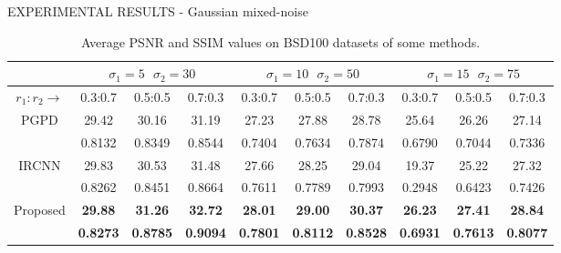 \begin{frame}{EXPERIMENTAL RESULTS - Gaussian mixed-noise}
    \begin{table}[htbp]
        \centering
        \begin{adjustbox}{width=0.8\textwidth}
        \begin{tabular}{|c||ccc|ccc|ccc|}
            \hline
                & \multicolumn{3}{c||}{$\sigma_1=5 ~~~\sigma_2=30 $} & \multicolumn{3}{c||}{$\sigma_1=10 ~~~\sigma_2=50 $} & \multicolumn{3}{c||}{$\sigma_1=15 ~~~\sigma_2=75 $}\\
            \hline        
            $r_1:r_2\rightarrow$ & 0.3:0.7 & 0.5:0.5 & 0.7:0.3 & 0.3:0.7 & 0.5:0.5 & 0.7:0.3 & 0.3:0.7 & 0.5:0.5 & 0.7:0.3\\
            \hline 
            \hline
            \multirow{2}{*}{PGPD\cite{0884882815}} & 29.42 & 30.16 & 31.19 & 27.23 & 27.88 & 28.78 &25.64 & 26.26 & 27.14\\
            & 0.8132 & 0.8349 & 0.8544 & 0.7404 & 0.7634 & 0.7874 & 0.6790 & 0.7044 & 0.7336\\
            \hline
            \multirow{2}{*}{IRCNN\cite{0884882819}} & 29.83 & 30.53 & 31.48 & 27.66 & 28.25 & 29.04 & 19.37 & 25.22 & 27.32\\
            & 0.8262 & 0.8451 & 0.8664 & 0.7611 & 0.7789 & 0.7993 & 0.2948 & 0.6423 & 0.7426\\
            \hline
            \multirow{2}{*}{Proposed} & \bfseries{29.88} & \bfseries{31.26} & \bfseries{32.72} & \bfseries{28.01} & \bfseries{29.00} & \bfseries{30.37} & \bfseries{26.23} & \bfseries{27.41} & \bfseries{28.84}\\
            & \bfseries{0.8273} & \bfseries{0.8785} & \bfseries{0.9094} & \bfseries{0.7801} & \bfseries{0.8112} & \bfseries{0.8528} & \bfseries{0.6931} & \bfseries{0.7613} & \bfseries{0.8077}\\
            \hline
        \end{tabular}
        \end{adjustbox}
        \caption{Average PSNR and SSIM values on BSD100 datasets of some methods.}
        \label{indexCompare}
    \end{table}
    
\end{frame}

